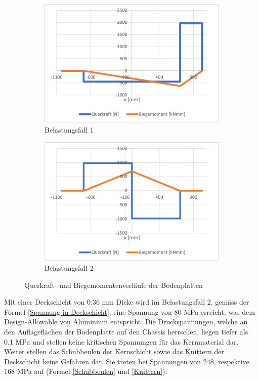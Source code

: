 \begin{figure}[!ht]
  \centering
    \begin{subfigure}{.5\textwidth}
      \centering
      \includegraphics[width=.98\linewidth]{04_figures/Boden QM1.png}
      \caption{Belastungsfall 1}
      \label{Boden QM1}
    \end{subfigure}%
    \begin{subfigure}{.5\textwidth}
      \centering
      \includegraphics[width=.98\linewidth]{04_figures/Boden QM2.png}
      \caption{Belastungsfall 2}
      \label{Boden QM2}
    \end{subfigure}%
  \caption{Querkraft- und Biegemomentenverläufe der Bodenplatten}
\label{Boden QM}
\end{figure}

Mit einer Deckschicht von 0.36 mm Dicke wird im Belastungsfall 2, gemäss der Formel \ref{Spannung in Deckschicht}, eine Spannung von 80 MPa erreicht, was dem Design-Allowable von Aluminium entspricht. Die Druckspannungen, welche an den Auflageflächen der Bodenplatte auf den Chassis herrschen, liegen tiefer als 0.1 MPa und stellen keine kritischen Spannungen für das Kernmaterial dar. Weiter stellen das Schubbeulen der Kernschicht sowie das Knittern der Deckschicht keine Gefahren dar. Sie treten bei Spannungen von 248, respektive 168 MPa auf (Formel \ref{Schubbeulen} und \ref{Knittern}).\\

